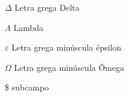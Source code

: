 \begin{simbolos}
\item[$ \Delta $] Letra grega Delta
\item[$ \Lambda $] Lambda
\item[$ \varepsilon $] Letra grega minúscula épsilon
\item[$ \Omega $] Letra grega minúscula Ômega
\item[\$ ] subcampo
\end{simbolos}